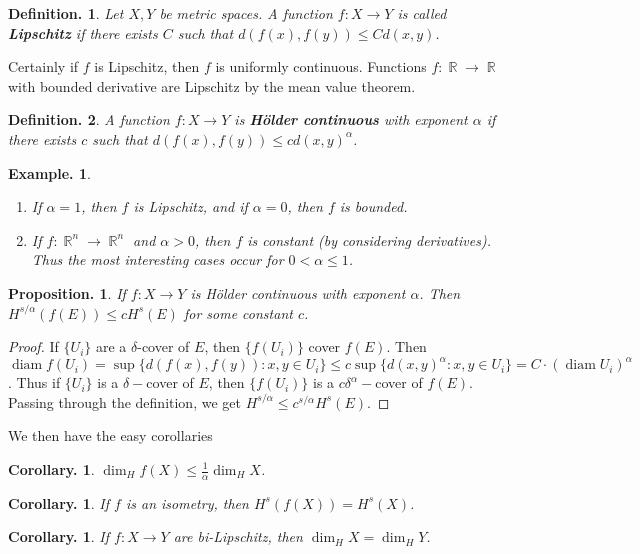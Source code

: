 \documentclass[11pt, a4paper]{memoir}
\DeclareMathOperator{\R}{{\mathbb{R}}}
\theoremstyle{change}
\newtheorem{corollary}[theorem]{Corollary.}
\newtheorem{proposition}[theorem]{Proposition.}
\theoremstyle{plain}
\theoremstyle{nonumberplain}
\newtheorem{definition}{Definition.}
\newtheorem{example}{Example.}
\newtheorem{proof}{Proof}
\newcommand{\defn}[1]{{\boldmath\bfseries #1}}
\DeclareMathOperator{\diam}{diam}
\numberwithin{equation}{section}
\begin{document}
\begin{definition}
    Let $X,Y$ be metric spaces.
    A function $f:X\to Y$ is called \defn{Lipschitz} if there exists $C$ such that $d(f(x),f(y))\leq Cd(x,y)$.
\end{definition}
Certainly if $f$ is Lipschitz, then $f$ is uniformly continuous.
Functions $f:\R\to\R$ with bounded derivative are Lipschitz by the mean value theorem.
\begin{definition}
    A function $f:X\to Y$ is \defn{Hölder continuous} with exponent $\alpha$ if there exists $c$ such that $d(f(x),f(y))\leq c d(x,y)^\alpha$.
\end{definition}
\begin{example}
    \begin{enumerate}[nl,r]
        \item If $\alpha=1$, then $f$ is Lipschitz, and if $\alpha=0$, then $f$ is bounded.
        \item If $f:\R^n\to\R^n$ and $\alpha>0$, then $f$ is constant (by considering derivatives).
            Thus the most interesting cases occur for $0<\alpha\leq 1$.
    \end{enumerate}
\end{example}
\begin{proposition}
    If $f:X\to Y$ is Hölder continuous with exponent $\alpha$.
    Then $H^{s/\alpha}(f(E))\leq cH^s(E)$ for some constant $c$.
\end{proposition}
\begin{proof}
    If $\{U_i\}$ are a $\delta$-cover of $E$, then $\{f(U_i)\}$ cover $f(E)$.
    Then $\diam f(U_i)=\sup\{d(f(x),f(y)):x,y\in U_i\}\leq c\sup\{d(x,y)^\alpha:x,y\in U_i\}=C\cdot(\diam U_i)^\alpha$.
    Thus if $\{U_i\}$ is a $\delta-$cover of $E$, then $\{f(U_i)\}$ is a $c\delta^\alpha-$cover of $f(E)$.
    Passing through the definition, we get $H^{s/\alpha}\leq c^{s/\alpha}H^s(E)$.
\end{proof}
We then have the easy corollaries
\begin{corollary}
    $\dim_H f(X)\leq\frac{1}{\alpha}\dim_H X$.
\end{corollary}
\begin{corollary}
    If $f$ is an isometry, then $H^s(f(X))=H^s(X)$.
\end{corollary}
\begin{corollary}
    If $f:X\to Y$ are bi-Lipschitz, then $\dim_H X=\dim_H Y$.
\end{corollary}
\end{document}
